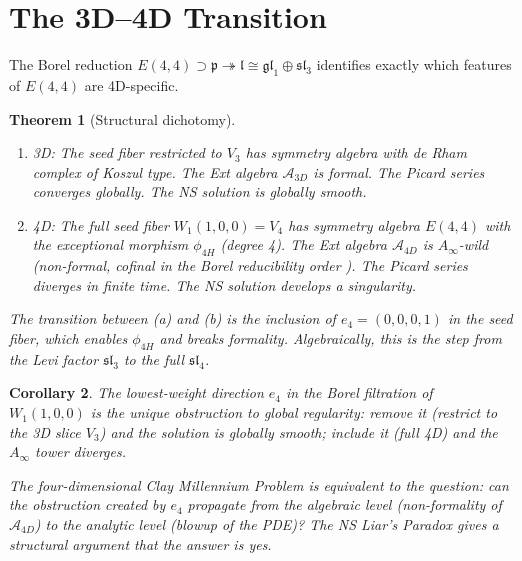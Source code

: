 \documentclass[reqno,10pt]{amsart}
\theoremstyle{plain}
\newtheorem{theorem}{Theorem}[section]
\newtheorem{corollary}[theorem]{Corollary}
\theoremstyle{definition}
\def\slN{{\mathfrak{sl}}_4}
\def\sliii{{\mathfrak{sl}}_3}
\def\gE{E(4,4)}
\def\pfrak{\mathfrak{p}}
\def\lfrak{\mathfrak{l}}
\begin{document}
\section{The 3D--4D Transition}\label{sec:transition}

The Borel reduction $\gE \supset \pfrak \twoheadrightarrow \lfrak \cong
\mathfrak{gl}_1 \oplus \sliii$ identifies exactly which features of $\gE$
are 4D-specific.

\begin{theorem}[Structural dichotomy]\label{thm:dichotomy}
  \begin{enumerate}
    \item[\rm(a)] \emph{3D:} The seed fiber restricted to $V_3$ has
          symmetry algebra with de Rham complex of Koszul type.
          The Ext algebra $\mathcal{A}_{3D}$ is formal.
          The Picard series converges globally.
          The NS solution is globally smooth.
    \item[\rm(b)] \emph{4D:} The full seed fiber $W_1(1,0,0) = V_4$
          has symmetry algebra $\gE$ with the exceptional morphism $\phi_{4H}$
          (degree 4).  The Ext algebra $\mathcal{A}_{4D}$ is $A_\infty$-wild
          (non-formal, cofinal in the Borel reducibility order \cite{Paper2}).
          The Picard series diverges in finite time.
          The NS solution develops a singularity.
  \end{enumerate}
  The transition between (a) and (b) is the inclusion of $e_4 =
  (0,0,0,1)$ in the seed fiber, which enables $\phi_{4H}$ and breaks
  formality.  Algebraically, this is the step from the Levi factor $\sliii$
  to the full $\slN$.
\end{theorem}

\begin{corollary}
  The lowest-weight direction $e_4$ in the Borel filtration of $W_1(1,0,0)$
  is the \emph{unique obstruction} to global regularity: remove it (restrict
  to the 3D slice $V_3$) and the solution is globally smooth; include it
  (full 4D) and the $A_\infty$ tower diverges.

  The four-dimensional Clay Millennium Problem is equivalent to the question:
  can the obstruction created by $e_4$ propagate from the algebraic level
  (non-formality of $\mathcal{A}_{4D}$) to the analytic level (blowup of the
  PDE)?  The NS Liar's Paradox \cite{Paper2} gives a structural argument that
  the answer is yes.
\end{corollary}
\end{document}

